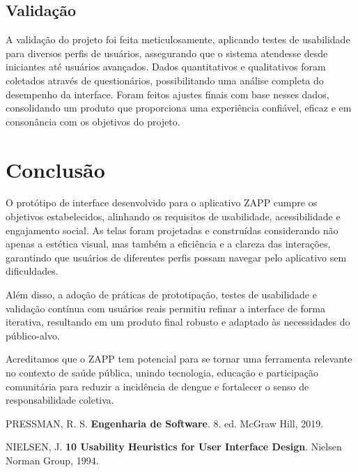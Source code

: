 \documentclass[a4paper, 12pt]{article}
\begin{document}
\subsection{Validação}
A validação do projeto foi feita meticulosamente, aplicando testes de usabilidade para diversos perfis de usuários, assegurando que o sistema atendesse desde iniciantes até usuários avançados. Dados quantitativos e qualitativos foram coletados através de questionários, possibilitando uma análise completa do desempenho da interface. Foram feitos ajustes finais com base nesses dados, consolidando um produto que proporciona uma experiência confiável, eficaz e em consonância com os objetivos do projeto.

\newpage
\section{Conclusão}

O protótipo de interface desenvolvido para o aplicativo ZAPP cumpre os objetivos estabelecidos, alinhando os requisitos de usabilidade, acessibilidade e engajamento social. As telas foram projetadas e construídas considerando não apenas a estética visual, mas também a eficiência e a clareza das interações, garantindo que usuários de diferentes perfis possam navegar pelo aplicativo sem dificuldades.  

Além disso, a adoção de práticas de prototipação, testes de usabilidade e validação contínua com usuários reais permitiu refinar a interface de forma iterativa, resultando em um produto final robusto e adaptado às necessidades do público-alvo.  

Acreditamos que o ZAPP tem potencial para se tornar uma ferramenta relevante no contexto de saúde pública, unindo tecnologia, educação e participação comunitária para reduzir a incidência de dengue e fortalecer o senso de responsabilidade coletiva.


\begin{thebibliography}{09}
 PRESSMAN, R. S. 
\textbf{Engenharia de Software}. 
8. ed. McGraw Hill, 2019.


 NIELSEN, J. 
\textbf{10 Usability Heuristics for User Interface Design}. 
Nielsen Norman Group, 1994.
\end{thebibliography}
\end{document}
